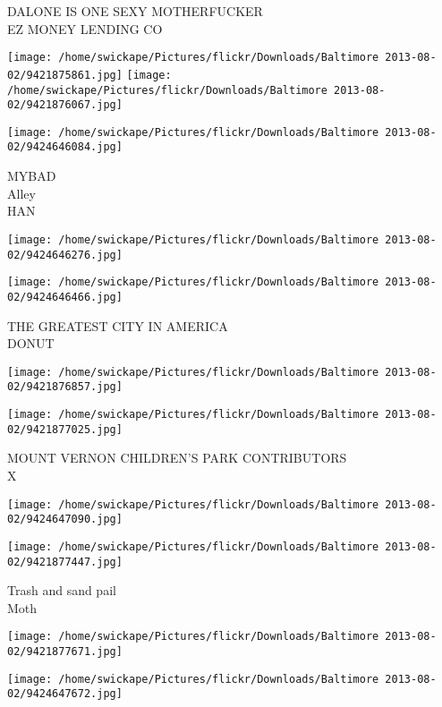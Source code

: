 \documentclass[10pt,letterpaper]{article}
\begin{document}
DALONE IS ONE SEXY MOTHERFUCKER\\
EZ MONEY LENDING CO\\
\pagebreak

\texttt{[image: /home/swickape/Pictures/flickr/Downloads/Baltimore 2013-08-02/9421875861.jpg]}
\texttt{[image: /home/swickape/Pictures/flickr/Downloads/Baltimore 2013-08-02/9421876067.jpg]}

\texttt{[image: /home/swickape/Pictures/flickr/Downloads/Baltimore 2013-08-02/9424646084.jpg]}

MYBAD\\
Alley\\
HAN\\
\pagebreak

\texttt{[image: /home/swickape/Pictures/flickr/Downloads/Baltimore 2013-08-02/9424646276.jpg]}

\vspace{0.25in}
\texttt{[image: /home/swickape/Pictures/flickr/Downloads/Baltimore 2013-08-02/9424646466.jpg]}

THE GREATEST CITY IN AMERICA\\
DONUT\\
\pagebreak

\texttt{[image: /home/swickape/Pictures/flickr/Downloads/Baltimore 2013-08-02/9421876857.jpg]}

\vspace{0.25in}
\texttt{[image: /home/swickape/Pictures/flickr/Downloads/Baltimore 2013-08-02/9421877025.jpg]}

MOUNT VERNON CHILDREN'S PARK CONTRIBUTORS\\
X\\
\pagebreak

\texttt{[image: /home/swickape/Pictures/flickr/Downloads/Baltimore 2013-08-02/9424647090.jpg]}

\vspace{0.25in}
\texttt{[image: /home/swickape/Pictures/flickr/Downloads/Baltimore 2013-08-02/9421877447.jpg]}

Trash and sand pail\\
Moth\\
\pagebreak

\texttt{[image: /home/swickape/Pictures/flickr/Downloads/Baltimore 2013-08-02/9421877671.jpg]}

\vspace{0.25in}
\texttt{[image: /home/swickape/Pictures/flickr/Downloads/Baltimore 2013-08-02/9424647672.jpg]}
\end{document}
